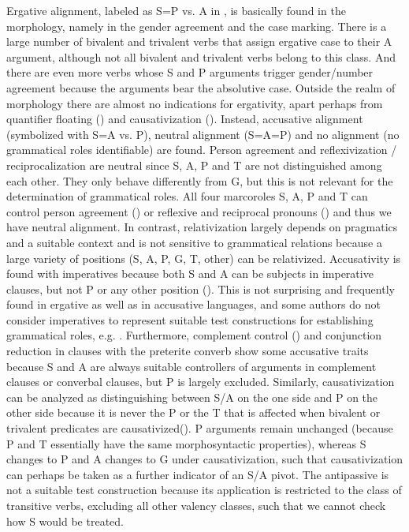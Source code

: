 Ergative alignment, labeled as S=P vs. A in , is basically found in the morphology, namely in the gender agreement and the case marking. There is a large number of bivalent and trivalent verbs that assign ergative case to their A argument, although not all bivalent and trivalent verbs belong to this class. And there are even more verbs whose S and P arguments trigger gender/number agreement because the arguments bear the absolutive case. Outside the realm of morphology there are almost no indications for ergativity, apart perhaps from quantifier floating () and causativization (). Instead, accusative alignment (symbolized with S=A vs. P), neutral alignment (S=A=P) and no alignment (no grammatical roles identifiable) are found. Person agreement and reflexivization / reciprocalization are neutral since S, A, P and T are not distinguished among each other. They only behave differently from G, but this is not relevant for the determination of grammatical roles. All four marcoroles S, A, P and T can control person agreement () or reflexive and reciprocal pronouns () and thus we have neutral alignment. In contrast, relativization largely depends on pragmatics and a suitable context and is not sensitive to grammatical relations because a large variety of positions (S, A, P, G, T, other) can be relativized. Accusativity is found with imperatives because both S and A can be subjects in imperative clauses, but not P or any other position (). This is not surprising and frequently found in ergative as well as in accusative languages, and some authors do not consider imperatives to represent suitable test constructions for establishing grammatical roles, e.g. \citet[131]{Dixon1994}. Furthermore, complement control () and conjunction reduction in clauses with the preterite converb show some accusative traits because S and A are always suitable controllers of arguments in complement clauses or converbal clauses, but P is largely excluded. Similarly, causativization can be analyzed as distinguishing between S/A on the one side and P on the other side because it is never the P or the T that is affected when bivalent or trivalent predicates are causativized(). P arguments remain unchanged (because P and T essentially have the same morphosyntactic properties), whereas S changes to P and A changes to G under causativization, such that causativization can perhaps be taken as a further indicator of an S/A pivot. The antipassive is not a suitable test construction because its application is restricted to the class of transitive verbs, excluding all other valency classes, such that we cannot check how S would be treated.

